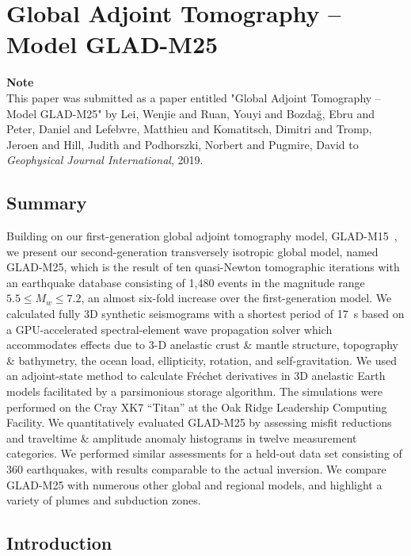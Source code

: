 \chapter{Global Adjoint Tomography -- Model GLAD-M25\label{ch:GLAD-M25}}

\textbf{Note}\\
This paper was submitted as a paper entitled "Global Adjoint Tomography -- Model GLAD-M25" by Lei, Wenjie and Ruan, Youyi and Bozda\u{g}, Ebru and Peter, Daniel and Lefebvre, Matthieu and Komatitsch, Dimitri and Tromp, Jeroen and Hill, Judith and Podhorszki, Norbert and Pugmire, David to \textit{Geophysical Journal International}, 2019.

\section{Summary}
Building on our first-generation global adjoint tomography model,
GLAD-M15~\cite{bozdaug2016global}, we present our second-generation transversely isotropic global model,
named GLAD-M25, which is the result of ten quasi-Newton tomographic iterations with an
earthquake database consisting of 1,480 events in the magnitude range $5.5\le M_w \le 7.2$,
an almost six-fold increase over the first-generation model.
We calculated fully 3D synthetic seismograms with a shortest period of 17~s based on a GPU-accelerated spectral-element wave
propagation solver which accommodates effects due to 3-D anelastic crust \& mantle structure, topography \& bathymetry, the ocean load, ellipticity, rotation, and self-gravitation.
We used an adjoint-state method to calculate Fr\'echet derivatives in 3D anelastic Earth models
facilitated by a parsimonious storage algorithm.
The simulations were performed on the Cray XK7 ``Titan'' at the Oak Ridge Leadership Computing Facility.
We quantitatively evaluated GLAD-M25 by assessing misfit reductions and traveltime \& amplitude anomaly histograms in twelve measurement
categories.
We performed similar assessments for a held-out data set consisting of 360 earthquakes,
with results comparable to the actual inversion.
We compare GLAD-M25 with numerous other global and regional models,
and highlight a variety of plumes and subduction zones.

\section{Introduction}

